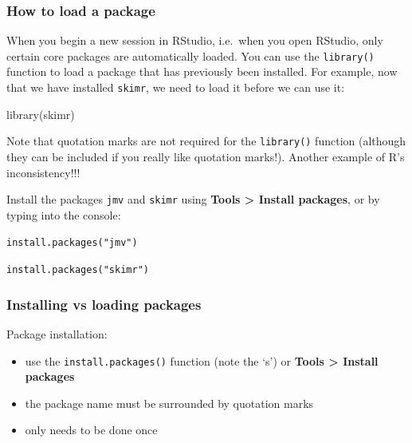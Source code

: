 \documentclass[
  a4paper,
]{memoir}
\newenvironment{Shaded}{\begin{snugshade}}{\end{snugshade}}
\newcommand{\FunctionTok}[1]{\textcolor[rgb]{0.00,0.00,0.00}{#1}}
\newcommand{\NormalTok}[1]{\textcolor[rgb]{0.00,0.00,0.00}{#1}}
\providecommand{\tightlist}{%
  \setlength{\itemsep}{0pt}\setlength{\parskip}{0pt}}
\begin{document}
\subsubsection{How to load a package}\label{how-to-load-a-package}

When you begin a new session in RStudio, i.e.~when you open RStudio,
only certain core packages are automatically loaded. You can use the
\texttt{library()} function to load a package that has previously been
installed. For example, now that we have installed \texttt{skimr}, we
need to load it before we can use it:

\begin{Shaded}
\begin{Highlighting}[]
\FunctionTok{library}\NormalTok{(skimr)}
\end{Highlighting}
\end{Shaded}

Note that quotation marks are not required for the \texttt{library()}
function (although they can be included if you really like quotation
marks!). Another example of R's inconsistency!!!

\begin{tcolorbox}[enhanced jigsaw, arc=.35mm, bottomrule=.15mm, bottomtitle=1mm, breakable, colback=white, colbacktitle=quarto-callout-note-color!10!white, colframe=quarto-callout-note-color-frame, coltitle=black, left=2mm, leftrule=.75mm, opacityback=0, opacitybacktitle=0.6, rightrule=.15mm, title={TASK}, titlerule=0mm, toprule=.15mm, toptitle=1mm]

Install the packages \texttt{jmv} and \texttt{skimr} using \textbf{Tools
\textgreater{} Install packages}, or by typing into the console:

\texttt{install.packages("jmv")}

\texttt{install.packages("skimr")}

\end{tcolorbox}

\subsubsection{Installing vs loading
packages}\label{installing-vs-loading-packages}

Package installation:

\begin{itemize}
\tightlist
\item
  use the \texttt{install.packages()} function (note the `s') or
  \textbf{Tools \textgreater{} Install packages}
\item
  the package name must be surrounded by quotation marks
\item
  only needs to be done once
\end{itemize}
\end{document}

